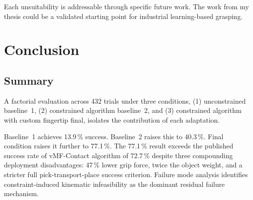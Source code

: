 \documentclass[oneside,studentpaper]{wbk}
\begin{document}
Each unsuitability is addressable through specific future work. The work from my thesis could be a validated starting point for industrial learning-based grasping. 


\chapter{Conclusion}
\label{chap:conclusion}

\section{Summary}
\label{sec:conclusion-summary}
A factorial evaluation across 432 trials under three conditions, (1) unconstrained baseline~1, (2) constrained algorithm baseline~2, and (3) constrained algorithm with custom fingertip final, isolates the contribution of each adaptation. 

Baseline~1 achieves 13.9\,\% success. Baseline~2 raises this to 40.3\,\%. Final condition raises it further to 77.1\,\%. The 77.1\,\% result exceeds the published success rate of vMF-Contact algorithm of 72.7\,\% despite three compounding deployment disadvantages: 47\,\% lower grip force, twice the object weight, and a stricter full pick-transport-place success criterion. Failure mode analysis identifies constraint-induced kinematic infeasibility as the dominant residual failure mechanism.


\end{document}
